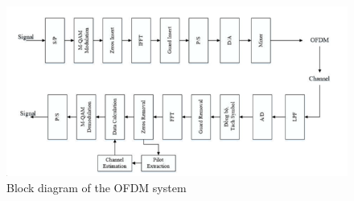 \begin{figure}[htbp]
    \centering
    \includegraphics[width=\textwidth]{Figures/Block-diagram.png}
    \caption{Block diagram of the OFDM system}
    \label{Block diagram}    
\end{figure}

